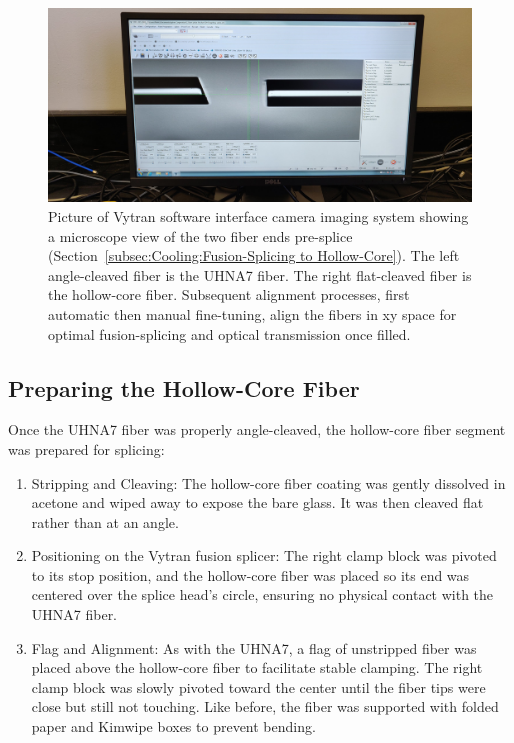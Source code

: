 \begin{figure}[t]
  \centering
  \includegraphics[width=\textwidth]{figs/3-Cooling/vytranCameraPreSplice.jpg}
  \caption{Picture of Vytran software interface camera imaging system showing a microscope view of the two fiber ends pre-splice (Section~\ref{subsec:Cooling:Fusion-Splicing to Hollow-Core}). The left angle-cleaved fiber is the \ac{UHNA7} fiber. The right flat-cleaved fiber is the hollow-core fiber. Subsequent alignment processes, first automatic then manual fine-tuning, align the fibers in xy space for optimal fusion-splicing and optical transmission once filled.}
  \label{fig:vytran camera pre splice}
\end{figure}

\subsection{Preparing the Hollow-Core Fiber}

Once the \ac{UHNA7} fiber was properly angle-cleaved, the hollow-core fiber segment was prepared for splicing:

\begin{enumerate}
	\item Stripping and Cleaving: The hollow-core fiber coating was gently dissolved in acetone and wiped away to expose the bare glass. It was then cleaved flat rather than at an angle.
	\item Positioning on the Vytran fusion splicer: The right clamp block was pivoted to its stop position, and the hollow-core fiber was placed so its end was centered over the splice head’s circle, ensuring no physical contact with the \ac{UHNA7} fiber.
	\item Flag and Alignment: As with the \ac{UHNA7}, a flag of unstripped fiber was placed above the hollow-core fiber to facilitate stable clamping. The right clamp block was slowly pivoted toward the center until the fiber tips were close but still not touching. Like before, the fiber was supported with folded paper and Kimwipe boxes to prevent bending.
\end{enumerate}

